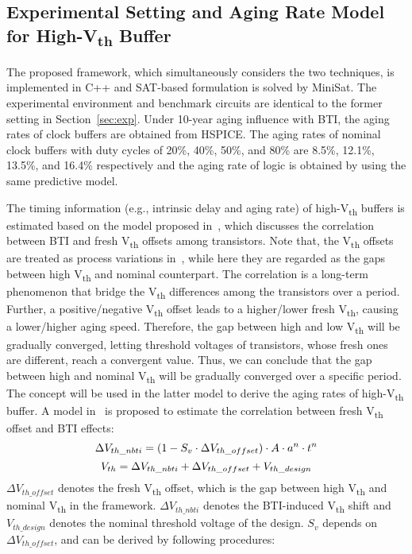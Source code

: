 \subsection{Experimental Setting and Aging Rate Model for High-V\textsubscript{th} Buffer}
\label{sec:TVA:experiment}
The proposed framework, which simultaneously considers the two techniques, is implemented in C++ and SAT-based formulation is solved by MiniSat. The experimental environment and benchmark circuits are identical to the former setting in Section~\ref{sec:exp}.
Under 10-year aging influence with BTI, the aging rates of clock buffers are obtained from HSPICE. The aging rates of nominal clock buffers with duty cycles of 20\%, 40\%, 50\%, and 80\% are 8.5\%, 12.1\%, 13.5\%, and 16.4\% respectively and the aging rate of logic is obtained by using the same predictive model. 

The timing information (e.g., intrinsic delay and aging rate) of high-V\textsubscript{th} buffers is estimated based on the model proposed in~\cite{andres2016}, which discusses the correlation between BTI and fresh V\textsubscript{th} offsets among transistors. Note that, the V\textsubscript{th} offsets are treated as process variations in~\cite{andres2016}, while here they are regarded as the gaps between high V\textsubscript{th} and nominal counterpart. The correlation is a long-term phenomenon that bridge the V\textsubscript{th} differences among the transistors over a period. Further, a positive/negative V\textsubscript{th} offset leads to a higher/lower fresh V\textsubscript{th}, causing a lower/higher aging speed. Therefore, the gap between high and low V\textsubscript{th} will be gradually converged, letting threshold voltages of transistors, whose fresh ones are different, reach a convergent value. Thus, we can conclude that the gap between high and nominal V\textsubscript{th} will be gradually converged over a specific period. The concept will be used in the latter model to derive the aging rates of high-V\textsubscript{th} buffer. A model in~\cite{andres2016} is proposed to estimate the correlation between fresh V\textsubscript{th} offset and BTI effects:
\begin{equation}
	\centering
	\Delta V_{th\_nbti} = (1 - S_{v} \cdot \Delta V_{th\_offset})  \cdot A \cdot a^n \cdot t^n
	\label{eq:cor}
\end{equation}
\begin{equation}
	\centering
	V_{th} = \Delta V_{th\_nbti} + \Delta V_{th\_offset} + V_{th\_design}
	\label{eq:conv}
\end{equation}
$\Delta V_{th\_offset}$ denotes the fresh V\textsubscript{th} offset, which is the gap between high V\textsubscript{th} and nominal V\textsubscript{th} in the framework. $\Delta V_{th\_nbti}$ denotes the BTI-induced V\textsubscript{th} shift and $V_{th\_design}$ denotes the nominal threshold voltage of the design. $S_{v}$ depends on $\Delta V_{th\_offset}$, and can be derived by following procedures:

